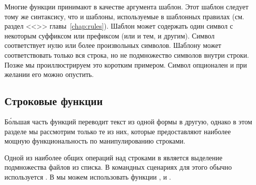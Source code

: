 Многие функции \GNUmake{} принимают в качестве аргумента шаблон.
Этот шаблон следует тому же синтаксису, что и шаблоны, используемые в
шаблонных правилах (см. раздел <<>>
главы~\ref{chap:rules}). Шаблон может содержать один символ
\command{\%{}} с некоторым суффиксом или префиксом (или и тем, и
другим). Символ \command{\%{}} соответствует нулю или более
произвольных символов. Шаблону может соответствовать только вся
строка, но не подмножество символов внутри строки.  Позже мы
проиллюстрируем это коротким примером. Символ \command{\%{}}
опционален и при желании его можно опустить.

\subsection{Строковые функции}
\label{sec:str_func}

Б\'{о}льшая часть функций \GNUmake{} переводит текст из одной формы в
другую, однако в этом разделе мы рассмотрим только те из них, которые
предоставляют наиболее мощную функциональность по манипулированию
строками.

Одной из наиболее общих операций над строками в \GNUmake{} является
выделение подмножества файлов из списка. В командных сценариях
для этого обычно используется . В \GNUmake{} мы
можем использовать функции , 
и .

